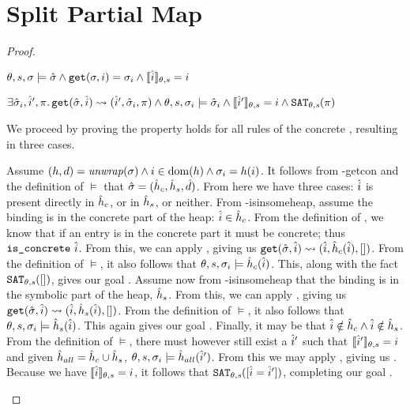 \section{Split Partial Map} \label{proofs:splitpmap-soundness}

\begin{proof}


\pfassume \begin{hypvlist}
 $\theta,s,\sigma \models \hat{\sigma} \land \texttt{get}(\sigma, i)=\sigma_i \land \llbracket\hat{i}\rrbracket_{\theta,s}=i$
\end{hypvlist}
\pfprove \begin{goalvlist}
 $\exists \hat{\sigma}_i, \hat{i}', \pi \ldotp \texttt{get}(\hat{\sigma},\hat{i})\rightsquigarrow(\hat{i}', \hat{\sigma}_i, \pi) \land \theta,s,\sigma_i\models\hat{\sigma}_i \land \llbracket\hat{i}'\rrbracket_{\theta,s}=i \land \texttt{SAT}_{\mathit{\theta,s}}(\pi)$
\end{goalvlist}

We proceed by proving the property holds for all rules of the concrete , resulting in three cases.


\begin{hypvlist}
 Assume $(h,d)={\operatorname{\mathit{unwrap}}}(\sigma) \land i\in\operatorname{dom}(h) \land \sigma_{i}=h(i)$.
 It follows from \hyp{getcon} and the definition of $\models$ that $\hat{\sigma}=(\hat{h}_c, \hat{h}_s, \hat{d})$. From here we have three cases: $\hat{i}$ is present directly in $\hat{h}_c$, or in $\hat{h}_s$, or neither.
 From \hyp{isinsomeheap}, assume the binding is in the concrete part of the heap: $\hat{i} \in \hat{h}_c$. From the definition of , we know that if an entry is in the concrete part it must be concrete; thus $\texttt{is\_concrete}~\hat{i}$. From this, we can apply , giving us $\texttt{get}(\hat{\sigma},\hat{i})\rightsquigarrow(\hat{i}, \hat{h}_c(\hat{i}), [])$. From the definition of $\models$, it also follows that $\theta,s,\sigma_i\models \hat{h}_c(\hat{i})$. This, along with the fact $\texttt{SAT}_{\mathit{\theta,s}}([])$, gives our goal .
 Assume now from \hyp{isinsomeheap} that the binding is in the symbolic part of the heap, $\hat{h}_s$. From this, we can apply , giving us $\texttt{get}(\hat{\sigma},\hat{i})\rightsquigarrow(\hat{i}, \hat{h}_s(\hat{i}), [])$. From the definition of $\models$, it also follows that $\theta,s,\sigma_i\models \hat{h}_s(\hat{i})$. This again gives our goal .
 Finally, it may be that $\hat{i} \notin \hat{h}_c \land \hat{i} \notin \hat{h}_s$. From the definition of $\models$, there must however still exist a $\hat{i}'$ such that $\llbracket\hat{i}'\rrbracket_{\theta,s}=i$ and given $\hat{h}_{all}=\hat{h}_c\cup\hat{h}_s$, $\theta,s,\sigma_i\models \hat{h}_{all}(\hat{i}')$. From this we may apply , giving us . Because we have $\llbracket\hat{i}\rrbracket_{\theta,s}=i$, it follows that $\texttt{SAT}_{\mathit{\theta,s}}([\hat{i}=\hat{i}'])$, completing our goal .
\end{hypvlist}


\end{proof}
